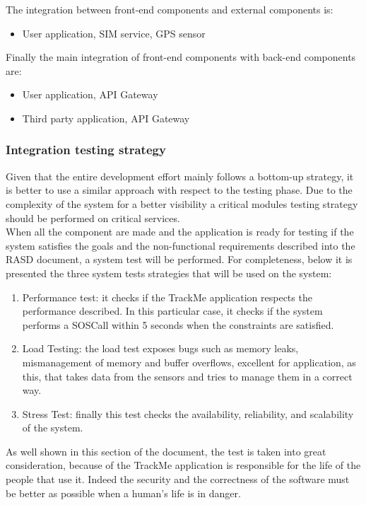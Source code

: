 The integration between front-end components and external components is:
\begin{itemize}
\item User application, SIM service, GPS sensor
\end{itemize}
Finally the main integration of front-end components with back-end components are: 
\begin{itemize}
\item User application, API Gateway
\item Third party application, API Gateway
\end{itemize}
\subsubsection{Integration testing strategy}
Given that the entire development effort mainly follows a bottom-up strategy, it is better to use a similar approach with respect to the testing phase. Due to the complexity of the system for a better visibility a critical modules testing strategy should be performed on critical services.\\
When all the component are made and the application is ready for testing if the system satisfies the goals and the non-functional requirements described into the RASD document, a system test will be performed. For completeness, below it is presented the three system tests strategies that will be used on the system: 
\begin{enumerate}
\item Performance test: it checks if the TrackMe application respects the performance described. In this particular case, it checks if the system performs a SOSCall within 5 seconds when the constraints are satisfied.
\item Load Testing: the load test exposes bugs such as memory leaks, mismanagement of memory and buffer overflows, excellent for application, as this, that takes data from the sensors and tries to manage them in a correct way.
\item Stress Test: finally this test checks the availability, reliability, and scalability of the system.
\end{enumerate}
As well shown in this section of the document, the test is taken into great consideration, because of the TrackMe application is responsible for the life of the people that use it. Indeed the security and the correctness of the software must be better as possible when a human's life is in danger. 